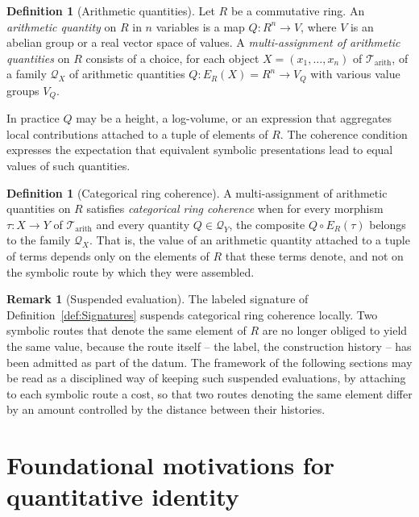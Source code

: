 \documentclass[10pt, reqno]{amsart}
\theoremstyle{plain}
\theoremstyle{definition}
\newtheorem{definition}[theorem]{Definition}
\newtheorem{remark}[theorem]{Remark}
\theoremstyle{plain}
\begin{document}
\begin{definition}[Arithmetic quantities]\label{def:MultiAssignment}
Let $R$ be a commutative ring. An \emph{arithmetic quantity} on $R$ in $n$ variables is a map $Q \colon R^n \to V$, where $V$ is an abelian group or a real vector space of values. A \emph{multi-assignment of arithmetic quantities} on $R$ consists of a choice, for each object $X = (x_1,\dots,x_n)$ of $\mathcal{T}_\mathrm{arith}$, of a family $\mathcal{Q}_X$ of arithmetic quantities $Q \colon E_R(X) = R^n \to V_Q$ with various value groups $V_Q$.
\end{definition}

In practice $Q$ may be a height, a log-volume, or an expression that aggregates local contributions attached to a tuple of elements of $R$. The coherence condition expresses the expectation that equivalent symbolic presentations lead to equal values of such quantities.

\begin{definition}[Categorical ring coherence]\label{def:RingCoherenceCategorical}
A multi-assignment of arithmetic quantities on $R$ satisfies \emph{categorical ring coherence} when for every morphism $\tau \colon X \to Y$ of $\mathcal{T}_\mathrm{arith}$ and every quantity $Q \in \mathcal{Q}_Y$, the composite $Q \circ E_R(\tau)$ belongs to the family $\mathcal{Q}_X$. That is, the value of an arithmetic quantity attached to a tuple of terms depends only on the elements of $R$ that these terms denote, and not on the symbolic route by which they were assembled.
\end{definition}

\begin{remark}[Suspended evaluation]\label{rem:SuspendedEvaluation}
The labeled signature of Definition~\ref{def:Signatures} suspends categorical ring coherence locally. Two symbolic routes that denote the same element of $R$ are no longer obliged to yield the same value, because the route itself -- the label, the construction history -- has been admitted as part of the datum. The framework of the following sections may be read as a disciplined way of keeping such suspended evaluations, by attaching to each symbolic route a cost, so that two routes denoting the same element differ by an amount controlled by the distance between their histories.
\end{remark}


\section{Foundational motivations for quantitative identity}\label{sec:FoundationalIdentity}
\end{document}
